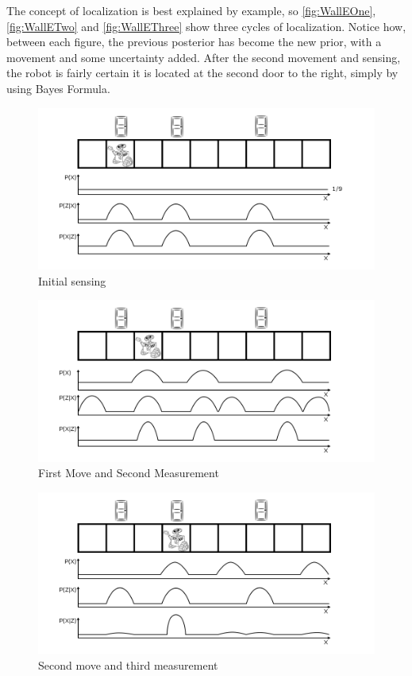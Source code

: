 \documentclass[Main]{subfiles}
\begin{document}
The concept of localization is best explained by example, so \autoref{fig:WallEOne}, \autoref{fig:WallETwo} and \autoref{fig:WallEThree} show three cycles of localization. 
Notice how, between each figure, the previous posterior has become the new prior, with a movement and some uncertainty added. 
After the second movement and sensing, the robot is fairly certain it is located at the second door to the right, simply by using Bayes Formula.\\
\begin{figure}[H]
	\centering
	\includegraphics[scale=0.35]{./Figures/WallEOne.png}
	\caption{Initial sensing}
	\label{fig:WallEOne}
\end{figure}\noindent
\begin{figure}[H]
	\centering
	\includegraphics[scale=0.35]{./Figures/WallETwo.png}
	\caption{First Move and Second Measurement}
	\label{fig:WallETwo}
\end{figure}\noindent
\begin{figure}[H]
	\centering
	\includegraphics[scale=0.35]{./Figures/WallEThree.png}
	\caption{Second move and third measurement}
	\label{fig:WallEThree}
\end{figure}\noindent 
\end{document}
